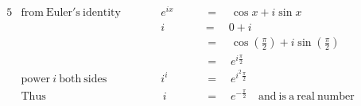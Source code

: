 \begin{alignat*}{5}
&\mathrm{from~Euler's~identity}&&\qquad e^{ix}\quad&&\,=\quad\cos{x}+i\sin{x}\\
&\,&&\qquad i\quad&&=\quad0+i\\
&\,&&\,\quad&&\,=\quad\cos{\left(\frac{\pi}{2}\right)}+i\sin{\left(\frac{\pi}{2}\right)}\\
&\,&&\,\quad&&\,=\quad e^{i\frac{\pi}{2}}\\
&\mathrm{power}~i~\mathrm{both~sides}&&\qquad i^i\quad&&\,=\quad e^{i^2\frac{\pi}{2}}\\
&\mathrm{Thus}&&\,\qquad i\quad&&\,=\quad e^{-\frac{\pi}{2}}\quad\mathrm{and~is~a~real~number}\\
\end{alignat*}
